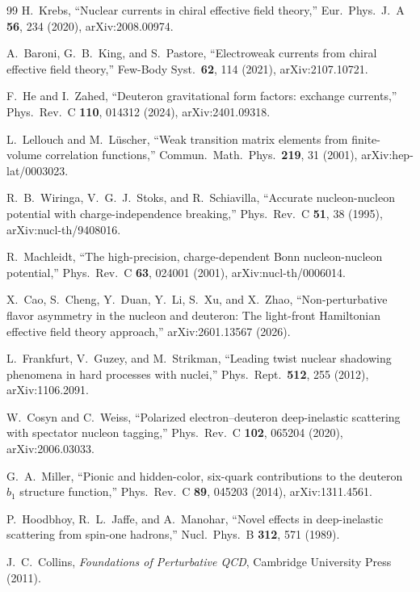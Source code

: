 \documentclass[11pt]{article}
\begin{document}
\begin{thebibliography}{99}
H.~Krebs,
``Nuclear currents in chiral effective field theory,''
Eur.\ Phys.\ J.\ A \textbf{56}, 234 (2020), arXiv:2008.00974.

A.~Baroni, G.~B.~King, and S.~Pastore,
``Electroweak currents from chiral effective field theory,''
Few-Body Syst.\ \textbf{62}, 114 (2021), arXiv:2107.10721.

F.~He and I.~Zahed,
``Deuteron gravitational form factors: exchange currents,''
Phys.\ Rev.\ C \textbf{110}, 014312 (2024), arXiv:2401.09318.

L.~Lellouch and M.~L\"uscher,
``Weak transition matrix elements from finite-volume correlation functions,''
Commun.\ Math.\ Phys.\ \textbf{219}, 31 (2001), arXiv:hep-lat/0003023.

R.~B.~Wiringa, V.~G.~J.~Stoks, and R.~Schiavilla,
``Accurate nucleon-nucleon potential with charge-independence breaking,''
Phys.\ Rev.\ C \textbf{51}, 38 (1995), arXiv:nucl-th/9408016.

R.~Machleidt,
``The high-precision, charge-dependent Bonn nucleon-nucleon potential,''
Phys.\ Rev.\ C \textbf{63}, 024001 (2001), arXiv:nucl-th/0006014.

X.~Cao, S.~Cheng, Y.~Duan, Y.~Li, S.~Xu, and X.~Zhao,
``Non-perturbative flavor asymmetry in the nucleon and deuteron: The
light-front Hamiltonian effective field theory approach,''
arXiv:2601.13567 (2026).

L.~Frankfurt, V.~Guzey, and M.~Strikman,
``Leading twist nuclear shadowing phenomena in hard processes with nuclei,''
Phys.\ Rept.\ \textbf{512}, 255 (2012), arXiv:1106.2091.

W.~Cosyn and C.~Weiss,
``Polarized electron--deuteron deep-inelastic scattering with spectator
nucleon tagging,''
Phys.\ Rev.\ C \textbf{102}, 065204 (2020), arXiv:2006.03033.

G.~A.~Miller,
``Pionic and hidden-color, six-quark contributions to the deuteron \(b_1\)
structure function,''
Phys.\ Rev.\ C \textbf{89}, 045203 (2014), arXiv:1311.4561.

P.~Hoodbhoy, R.~L.~Jaffe, and A.~Manohar,
``Novel effects in deep-inelastic scattering from spin-one hadrons,''
Nucl.\ Phys.\ B \textbf{312}, 571 (1989).

J.~C.~Collins,
\emph{Foundations of Perturbative QCD},
Cambridge University Press (2011).

\end{thebibliography}
\end{document}
